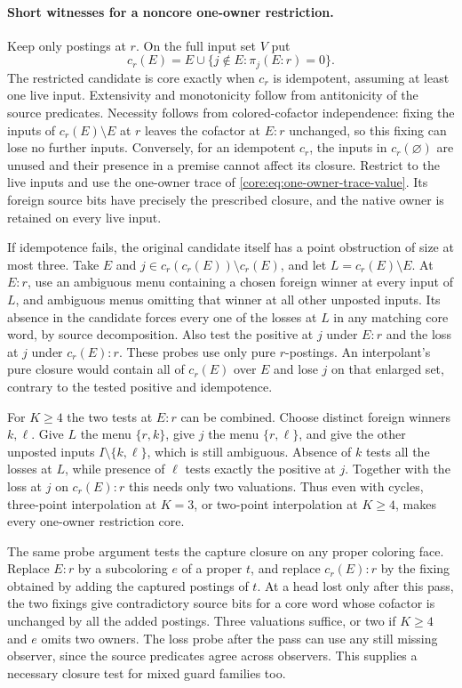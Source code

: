 \paragraph{Short witnesses for a noncore one-owner restriction.}
Keep only postings at $r$. On the full input set $V$ put
\[
 c_r(E)=E\cup\{j\notin E:\pi_j(E:r)=0\}.
\]
The restricted candidate is core exactly when $c_r$ is
idempotent, assuming at least one live input. Extensivity
and monotonicity follow from antitonicity of the source
predicates. Necessity follows from colored-cofactor
independence: fixing the inputs of $c_r(E)\setminus E$
at $r$ leaves the cofactor at $E:r$ unchanged, so this
fixing can lose no further inputs. Conversely, for an
idempotent $c_r$, the inputs in $c_r(\varnothing)$ are
unused and their presence in a premise cannot affect its
closure. Restrict to the live inputs and use the one-owner
trace of \eqref{core:eq:one-owner-trace-value}. Its foreign
source bits have precisely the prescribed closure, and
the native owner is retained on every live input.

If idempotence fails, the original candidate itself has
a point obstruction of size at most three. Take $E$ and
$j\in c_r(c_r(E))\setminus c_r(E)$, and let
$L=c_r(E)\setminus E$. At $E:r$, use an ambiguous menu
containing a chosen foreign winner at every input of
$L$, and ambiguous menus omitting that winner at all
other unposted inputs. Its absence in the candidate
forces every one of the losses at $L$ in any matching
core word, by source decomposition. Also test the
positive at $j$ under $E:r$ and the loss at $j$ under
$c_r(E):r$. These probes use only pure $r$-postings.
An interpolant's pure closure would contain all of
$c_r(E)$ over $E$ and lose $j$ on that enlarged set,
contrary to the tested positive and idempotence.

For $K\ge4$ the two tests at $E:r$ can be combined.
Choose distinct foreign winners $k,\ell$. Give $L$
the menu $\{r,k\}$, give $j$ the menu $\{r,\ell\}$,
and give the other unposted inputs $I\setminus\{k,\ell\}$,
which is still ambiguous. Absence of $k$ tests all the
losses at $L$, while presence of $\ell$ tests exactly
the positive at $j$. Together with the loss at $j$ on
$c_r(E):r$ this needs only two valuations. Thus even
with cycles, three-point interpolation at $K=3$, or
two-point interpolation at $K\ge4$, makes every
one-owner restriction core.

The same probe argument tests the capture closure on
any proper coloring face. Replace $E:r$ by a subcoloring
$e$ of a proper $t$, and replace $c_r(E):r$ by the
fixing obtained by adding the captured postings of $t$.
At a head lost only after this pass, the two fixings
give contradictory source bits for a core word whose
cofactor is unchanged by all the added postings.
Three valuations suffice, or two if $K\ge4$ and $e$
omits two owners. The loss probe after the pass can
use any still missing observer, since the source
predicates agree across observers. This supplies a
necessary closure test for mixed guard families too.

